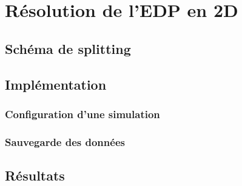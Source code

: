 
\chapter{Résolution de l'EDP en 2D} %

\label{Chapter4} %


\section{Schéma de splitting}


\section{Implémentation}


\subsection{Configuration d'une simulation}


\subsection{Sauvegarde des données}


\section{Résultats}


